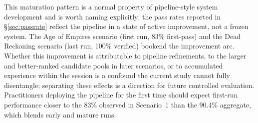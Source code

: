 This maturation pattern is a normal property of pipeline-style system development and is worth naming explicitly: the pass rates reported in \S\ref{sec:passrate} reflect the pipeline in a state of active improvement, not a frozen system. The Age of Empires scenario (first run, 83\% first-pass) and the Dead Reckoning scenario (last run, 100\% verified) bookend the improvement arc. Whether this improvement is attributable to pipeline refinements, to the larger and better-ranked candidate pools in later scenarios, or to accumulated experience within the session is a confound the current study cannot fully disentangle; separating these effects is a direction for future controlled evaluation. Practitioners deploying the pipeline for the first time should expect first-run performance closer to the 83\% observed in Scenario~1 than the 90.4\% aggregate, which blends early and mature runs.
